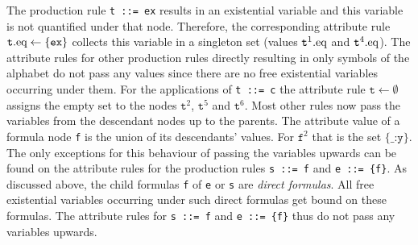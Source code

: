 The production rule \texttt{t ::= ex} results in an existential variable and this variable is not quantified under that node.
Therefore, the corresponding attribute rule $\texttt{t}.\text{eq} \leftarrow \{\texttt{ex}\}$ collects this variable in a singleton set 
(values $\texttt{t}^1.\text{eq}$ and $\texttt{t}^4.\text{eq}$).  
The attribute rules for other production rules directly resulting in only symbols of the alphabet do not pass any values since there are
no free existential variables occurring under them. 
For the applications of \texttt{t ::= c} %
the attribute rule
%
 $\texttt{t}\leftarrow \emptyset$ assigns the empty set to the nodes $\texttt{t}^2$, $\texttt{t}^5$ and $\texttt{t}^6$.
Most other rules now pass the variables from the descendant nodes up to the parents. 
The attribute value  of a
 formula node \texttt{f} 
is the union of its descendants' values. For $\texttt{f}^2$ that is the set $\{\texttt{\_:y}\}$.
The only exceptions for this behaviour of passing the variables upwards can be found on the attribute rules for the production rules \texttt{s ::= f} 
and \texttt{e ::= \{f\}}. 
As discussed above, the child formulas \texttt{f} of 
\texttt{e} or \texttt{s} are \emph{direct formulas}. %
All free existential variables occurring 
under such direct formulas get bound on these formulas. The attribute rules for \texttt{s ::= f} 
and \texttt{e ::= \{f\}} thus do  not pass any variables upwards. 
